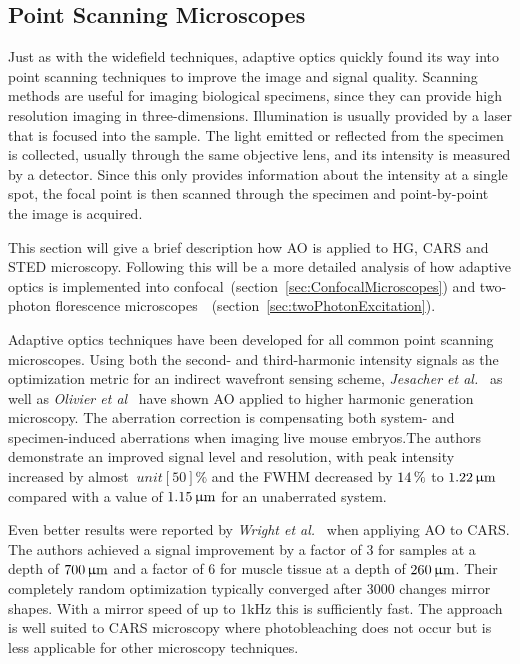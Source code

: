 \subsection{Point Scanning Microscopes}
\label{sec:PointScanningMicroscopes}

Just as with the widefield techniques, adaptive optics quickly found its way into point scanning techniques to improve the image and signal quality. Scanning methods are useful for imaging biological specimens, since they can provide high resolution imaging in three-dimensions. Illumination is usually provided by a laser that is focused into the sample. The light emitted or reflected from the specimen is collected, usually through the same objective lens, and its intensity is measured by a detector. Since this only provides information about the intensity at a single spot, the focal point is then scanned through the specimen and point-by-point the image is acquired. 

This section will give a brief description how AO is applied to HG, CARS and STED microscopy. Following this will be a more detailed analysis of how adaptive optics is implemented into confocal~(section~\ref{sec:ConfocalMicroscopes}) and two-photon florescence microscopes~~(section~\ref{sec:twoPhotonExcitation}). 


Adaptive optics techniques have been developed for all common point scanning microscopes. 
Using both the second- and third-harmonic intensity signals as the optimization metric for an indirect wavefront sensing scheme, \emph{Jesacher et al.}~\cite{scan_HG_dynamic} as well as \emph{Olivier et al}~\cite{scan_HG_embryos} have shown AO applied to higher harmonic generation microscopy. The aberration correction is compensating both system- and specimen-induced aberrations when imaging live mouse embryos.The authors demonstrate an improved signal level and resolution, with peak intensity increased by almost $\ unit[50]{\%}$ and the FWHM decreased by $\unit[14]{\%}$ to  $\unit[1.22]{\upmu m}$ compared with a value of $\unit[1.15]{\upmu m}$ for an unaberrated system.

Even better results were reported by \emph{Wright et al.}~\cite{scan_CARS} when appliying AO to CARS. The authors achieved a signal improvement by a factor of 3 for samples at a depth of $\unit[700]{\upmu m}$ and a factor of 6 for muscle tissue at a depth of $\unit[260]{\upmu m}$. Their completely random optimization typically converged after 3000 changes mirror shapes. With a mirror speed of up to 1kHz this is sufficiently fast.  The approach is well suited to CARS microscopy where photobleaching does not occur but is less applicable for other microscopy techniques. 

